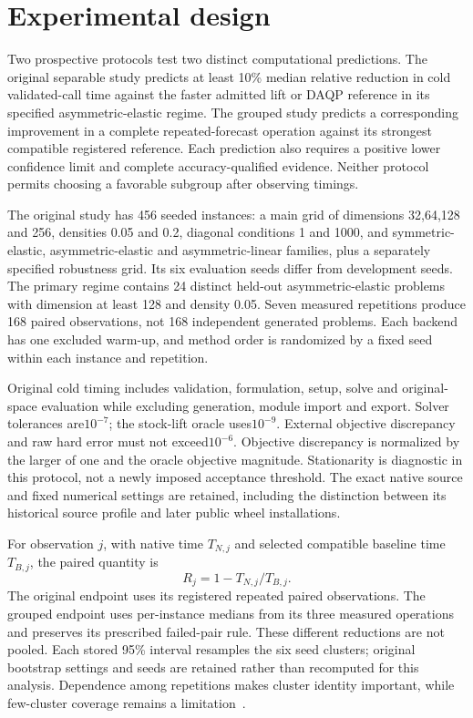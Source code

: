 \section{Experimental design}\label{sec:design}
Two prospective protocols test two distinct computational predictions.
The original separable study predicts at least 10\% median relative
reduction in cold validated-call time against the faster admitted lift
or DAQP reference in its specified asymmetric-elastic regime. The
grouped study predicts a corresponding improvement in a complete
repeated-forecast operation against its strongest compatible registered
reference. Each prediction also requires a positive lower confidence
limit and complete accuracy-qualified evidence. Neither protocol permits
choosing a favorable subgroup after observing timings.

The original study has 456 seeded instances: a main grid of dimensions
32,64,128 and 256, densities 0.05 and 0.2, diagonal conditions 1 and 1000,
and symmetric-elastic, asymmetric-elastic and asymmetric-linear
families, plus a separately specified robustness grid. Its six
evaluation seeds differ from development seeds. The primary regime
contains 24 distinct held-out asymmetric-elastic problems with dimension
at least 128 and density 0.05. Seven measured repetitions produce 168
paired observations, not 168 independent generated problems. Each backend
has one excluded warm-up, and method order is randomized by a fixed
seed within each instance and repetition.

Original cold timing includes validation, formulation, setup, solve
and original-space evaluation while excluding generation, module
import and export. Solver tolerances are$10^{-7}$; the stock-lift
oracle uses$10^{-9}$. External objective discrepancy and raw hard
error must not exceed$10^{-6}$. Objective discrepancy is normalized
by the larger of one and the oracle objective magnitude. Stationarity
is diagnostic in this protocol, not a newly imposed acceptance threshold.
The exact native source and fixed numerical settings are retained,
including the distinction between its historical source profile and
later public wheel installations.

For observation $j$, with native time $T_{N,j}$ and selected compatible
baseline time $T_{B,j}$, the paired quantity is
\begin{equation}\label{eq:paper-reduction}
 R_j=1-T_{N,j}/T_{B,j}.
\end{equation}
The original endpoint uses its registered repeated paired observations.
The grouped endpoint uses per-instance medians from its three measured
operations and preserves its prescribed failed-pair rule. These
different reductions are not pooled. Each stored 95\% interval resamples
the six seed clusters; original bootstrap settings and seeds are
retained rather than recomputed for this analysis. Dependence among
repetitions makes cluster identity important, while few-cluster
coverage remains a limitation~\cite{efron,davison,cameron}.

